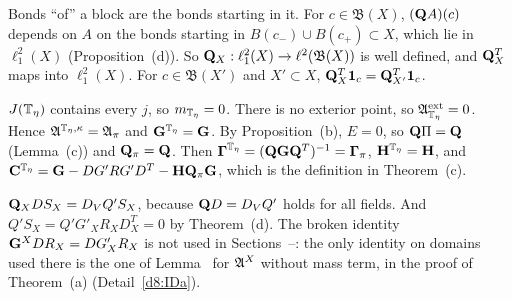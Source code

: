 \begin{detail}\label{d8:defs}
\begin{step}
Bonds ``of'' a block are the bonds starting in it. For $c\in\mathfrak B(X)$, $(\mathbf Q A)(c)$ depends on $A$ on the bonds starting in $B(c_-)\cup B(c_+)\subset X$, which lie in $\ell^2_1(X)$ (Proposition~(d)). So $\mathbf Q_X:\ell^2_1(X)\to\ell^2(\mathfrak B(X))$ is well defined, and $\mathbf Q_X^T$ maps into $\ell^2_1(X)$. For $c\in\mathfrak B(X')$ and $X'\subset X$, $\mathbf Q_X^T\mathbf 1_c=\mathbf Q_{X'}^T\mathbf 1_c$.
\end{step}
\begin{step}[$X=\Tf$]
$J(\mathbb T_\eta)$ contains every $j$, so $m_{\mathbb T_\eta}=0$. There is no exterior point, so $\mathfrak A^{\rm ext}_{\mathbb T_\eta}=0$. Hence $\mathfrak A^{\mathbb T_\eta,\kappa}=\mathfrak A_\pi$ and $\mathbf G^{\mathbb T_\eta}=\mathbf G$. By Proposition~(b), $E=0$, so $\mathbf Q\Pi=\mathbf Q$ (Lemma~(c)) and $\mathbf Q_\pi=\mathbf Q$. Then $\boldsymbol\Gamma^{\mathbb T_\eta}=(\mathbf Q\mathbf G\mathbf Q^T)^{-1}=\boldsymbol\Gamma_\pi$, $\mathbf H^{\mathbb T_\eta}=\mathbf H$, and $\mathbf C^{\mathbb T_\eta}=\mathbf G-DG'RG'D^T-\mathbf H\mathbf Q_\pi\mathbf G$, which is the definition in Theorem~(c).
\end{step}
\begin{step}
$\mathbf Q_XDS_X=D_VQ'S_X$, because $\mathbf Q D=D_VQ'$ holds for all fields. And $Q'S_X=Q'G'_XR_XD^T_X=0$ by Theorem~(d). The broken identity $\mathbf G^XDR_X=DG'_XR_X$ is not used in Sections~--: the only identity on domains used there is the one of Lemma~ for $\mathfrak A^X$ without mass term, in the proof of Theorem~(a) (Detail~\ref{d8:IDa}).
\end{step}
\end{detail}

